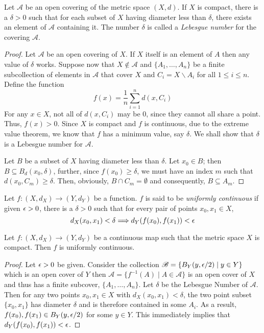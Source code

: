 \begin{lemma}
    Let $\mathscr{A}$ be an open covering of the metric space $(X,d)$. If $X$ is compact, there is a $\delta > 0$ such that for each subset of $X$ having diameter less than $\delta$, there exists an element of $\mathscr{A}$ containing it. The number $\delta$ is called a \textit{Lebesgue number} for the covering $\mathscr{A}$.
\end{lemma}
\begin{proof}
    Let $\mathscr{A}$ be an open covering of $X$. If $X$ itself is an element of $A$ then any value of $\delta$ works. Suppose now that $X\notin\mathscr{A}$ and $\{A_1,\ldots,A_n\}$ be a finite subcollection of elements in $\mathscr{A}$ that cover $X$ and $C_i = X\backslash A_i$ for all $1\le i\le n$. Define the function 
    \begin{equation*}
        f(x) = \frac{1}{n}\sum_{i=1}^nd(x, C_i)
    \end{equation*}
    For any $x\in X$, not all of $d(x,C_i)$ may be $0$, since they cannot all share a point. Thus, $f(x) > 0$. Since $X$ is compact and $f$ is continuous, due to the extreme value theorem, we know that $f$ has a minimum value, say $\delta$. We shall show that $\delta$ is a Lebesgue number for $\mathscr{A}$.

    Let $B$ be a subset of $X$ having diameter less than $\delta$. Let $x_0\in B$; then $B\subseteq B_d(x_0, \delta)$, further, since $f(x_0)\ge\delta$, we must have an index $m$ such that $d(x_0, C_m)\ge\delta$. Then, obviously, $B\cap C_m =\emptyset$ and consequently, $B\subseteq A_m$.
\end{proof}

\begin{definition}
    Let $f:(X, d_X)\to (Y,d_Y)$ be a function. $f$ is said to be \textit{uniformly continuous} if given $\epsilon > 0$, there is a $\delta > 0$ such that for every pair of points $x_0, x_1\in X$,
    \begin{equation*}
        d_X(x_0, x_1) < \delta\Longrightarrow d_Y(f(x_0), f(x_1)) < \epsilon
    \end{equation*}
\end{definition}

\begin{theorem}
    Let $f:(X, d_X)\to (Y, d_Y)$ be a continuous map such that the metric space $X$ is compact. Then $f$ is uniformly continuous.
\end{theorem}
\begin{proof}
    Let $\epsilon > 0$ be given. Consider the collection $\mathscr{B} = \{B_Y(y,\epsilon/2)\mid y\in Y\}$ which is an open cover of $Y$ then $\mathscr{A} = \{f^{-1}(A)\mid A\in\mathscr{A}\}$ is an open cover of $X$ and thus has a finite subcover, $\{A_1,\ldots,A_n\}$. Let $\delta$ be the Lebesgue Number of $\mathscr{A}$. Then for any two points $x_0, x_1\in X$ with $d_X(x_0, x_1) < \delta$, the two point subset $\{x_0, x_1\}$ has diameter $\delta$ and is therefore contained in some $A_i$. As a result, $f(x_0), f(x_1)\in B_Y(y,\epsilon/2)$ for some $y\in Y$. This immediately implies that $d_Y(f(x_0), f(x_1)) < \epsilon$.
\end{proof}

